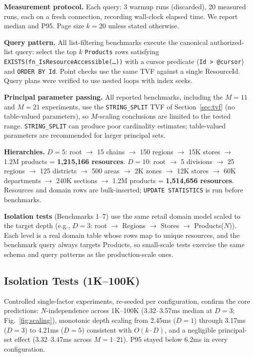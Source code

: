 \documentclass[conference]{IEEEtran}
\begin{document}
\textbf{Measurement protocol.} Each query: 3 warmup runs (discarded), 20 measured runs, each on a fresh connection, recording wall-clock elapsed time. We report median and P95. Page size $k = 20$ unless stated otherwise.

\textbf{Query pattern.} All list-filtering benchmarks execute the canonical authorized-list query: select the top $k$ \texttt{Products} rows satisfying \texttt{EXISTS(fn\_IsResourceAccessible(\ldots))} with a cursor predicate (\texttt{Id > @cursor}) and \texttt{ORDER BY Id}. Point checks use the same TVF against a single ResourceId. Query plans were verified to use nested loops with index seeks.

\textbf{Principal parameter passing.} All reported benchmarks, including the $M{=}11$ and $M{=}21$ experiments, use the \texttt{STRING\_SPLIT} TVF of Section~\ref{sec:tvf} (no table-valued parameters), so $M$-scaling conclusions are limited to the tested range. \texttt{STRING\_SPLIT} can produce poor cardinality estimates; table-valued parameters are recommended for larger principal sets.

\textbf{Hierarchies.} $D{=}5$: root $\to$ 15 chains $\to$ 150 regions $\to$ 15K stores $\to$ 1.2M products = \textbf{1,215,166 resources}. $D{=}10$: root $\to$ 5 divisions $\to$ 25 regions $\to$ 125 districts $\to$ 500 areas $\to$ 2K zones $\to$ 12K stores $\to$ 60K departments $\to$ 240K sections $\to$ 1.2M products = \textbf{1,514,656 resources}. Resources and domain rows are bulk-inserted; \texttt{UPDATE STATISTICS} is run before benchmarks.

\textbf{Isolation tests} (Benchmarks 1--7) use the same retail domain model scaled to the target depth (e.g., $D{=}3$: root $\to$ Regions $\to$ Stores $\to$ Products($N$)). Each level is a real domain table whose rows map to unique resources, and the benchmark query always targets Products, so small-scale tests exercise the same schema and query patterns as the production-scale ones.

\subsection{Isolation Tests (1K--100K)}

Controlled single-factor experiments, re-seeded per configuration, confirm the core predictions: $N$-independence across 1K--100K (3.32--3.57ms median at $D{=}3$; Fig.~\ref{fig:scaling}), monotonic depth scaling from 2.45ms ($D{=}1$) through 3.17ms ($D{=}3$) to 4.21ms ($D{=}5$) consistent with $O(k \cdot D)$, and a negligible principal-set effect (3.32--3.47ms across $M{=}1$--$21$). P95 stayed below 6.2ms in every configuration.
\end{document}
